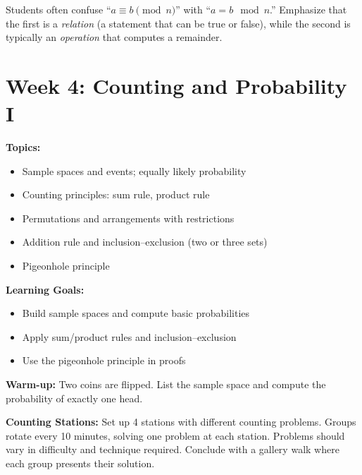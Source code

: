 \documentclass[11pt]{article}
\begin{document}
\begin{tipbox}
Students often confuse ``$a \equiv b \pmod{n}$'' with ``$a = b \mod n$.'' Emphasize that the first is a \textit{relation} (a statement that can be true or false), while the second is typically an \textit{operation} that computes a remainder.
\end{tipbox}

\newpage
\section{Week 4: Counting and Probability I}

\begin{classabox}
\textbf{Topics:}
\begin{itemize}
    \item Sample spaces and events; equally likely probability
    \item Counting principles: sum rule, product rule
    \item Permutations and arrangements with restrictions
    \item Addition rule and inclusion--exclusion (two or three sets)
    \item Pigeonhole principle
\end{itemize}

\textbf{Learning Goals:}
\begin{itemize}
    \item Build sample spaces and compute basic probabilities
    \item Apply sum/product rules and inclusion--exclusion
    \item Use the pigeonhole principle in proofs
\end{itemize}

\textbf{Warm-up:} Two coins are flipped. List the sample space and compute the probability of exactly one head.
\end{classabox}

\begin{activitybox}
\textbf{Counting Stations:} Set up 4 stations with different counting problems. Groups rotate every 10 minutes, solving one problem at each station. Problems should vary in difficulty and technique required. Conclude with a gallery walk where each group presents their solution.
\end{activitybox}
\end{document}
